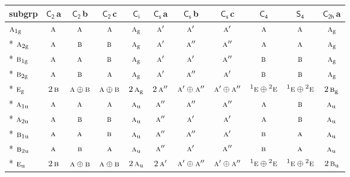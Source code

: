 \documentclass[10pt,a4paper]{article}
\numberwithin{equation}{section}
\newcommand{\grp}[1]{\mathsf{#1}}
\newcommand{\irr}[1]{\text{\normalfont\scshape #1}}
\newcommand{\conjpair}[1]{{}^{#1}}
\newcommand{\ptag}[1]{\mathrm{#1}}
\newcommand{\clsletter}[1]{\,{\scriptsize\color{black!55}#1}}
\begin{document}
{\small\begin{longtable}{@{}lcccccccccc@{}}\toprule
subgrp & \href{C2.pdf}{$\grp{C_{2}}$}\clsletter{a} & \href{C2.pdf}{$\grp{C_{2}}$}\clsletter{b} & \href{C2.pdf}{$\grp{C_{2}}$}\clsletter{c} & \href{S2.pdf}{$\grp{C_{i}}$} & \href{C1v.pdf}{$\grp{C_{s}}$}\clsletter{a} & \href{C1v.pdf}{$\grp{C_{s}}$}\clsletter{b} & \href{C1v.pdf}{$\grp{C_{s}}$}\clsletter{c} & \href{C4.pdf}{$\grp{C_{4}}$} & \href{S4.pdf}{$\grp{S_{4}}$} & \href{C2h.pdf}{$\grp{C_{2h}}$}\clsletter{a}\\\midrule\endhead
\bottomrule\endfoot\endlastfoot
$\irr{a}_{1\ptag{g}}$ & $\irr{a}$ & $\irr{a}$ & $\irr{a}$ & $\irr{a}_{\ptag{g}}$ & $\irr{a}'$ & $\irr{a}'$ & $\irr{a}'$ & $\irr{a}$ & $\irr{a}$ & $\irr{a}_{\ptag{g}}$\\*
$\irr{a}_{2\ptag{g}}$ & $\irr{a}$ & $\irr{b}$ & $\irr{b}$ & $\irr{a}_{\ptag{g}}$ & $\irr{a}'$ & $\irr{a}''$ & $\irr{a}''$ & $\irr{a}$ & $\irr{a}$ & $\irr{a}_{\ptag{g}}$\\*
$\irr{b}_{1\ptag{g}}$ & $\irr{a}$ & $\irr{a}$ & $\irr{b}$ & $\irr{a}_{\ptag{g}}$ & $\irr{a}'$ & $\irr{a}'$ & $\irr{a}''$ & $\irr{b}$ & $\irr{b}$ & $\irr{a}_{\ptag{g}}$\\*
$\irr{b}_{2\ptag{g}}$ & $\irr{a}$ & $\irr{b}$ & $\irr{a}$ & $\irr{a}_{\ptag{g}}$ & $\irr{a}'$ & $\irr{a}''$ & $\irr{a}'$ & $\irr{b}$ & $\irr{b}$ & $\irr{a}_{\ptag{g}}$\\*
$\irr{e}_{\ptag{g}}$ & $2\,\irr{b}$ & $\irr{a}\oplus \irr{b}$ & $\irr{a}\oplus \irr{b}$ & $2\,\irr{a}_{\ptag{g}}$ & $2\,\irr{a}''$ & $\irr{a}'\oplus \irr{a}''$ & $\irr{a}'\oplus \irr{a}''$ & $\conjpair{1}\irr{e}\oplus \conjpair{2}\irr{e}$ & $\conjpair{1}\irr{e}\oplus \conjpair{2}\irr{e}$ & $2\,\irr{b}_{\ptag{g}}$\\*
$\irr{a}_{1\ptag{u}}$ & $\irr{a}$ & $\irr{a}$ & $\irr{a}$ & $\irr{a}_{\ptag{u}}$ & $\irr{a}''$ & $\irr{a}''$ & $\irr{a}''$ & $\irr{a}$ & $\irr{b}$ & $\irr{a}_{\ptag{u}}$\\*
$\irr{a}_{2\ptag{u}}$ & $\irr{a}$ & $\irr{b}$ & $\irr{b}$ & $\irr{a}_{\ptag{u}}$ & $\irr{a}''$ & $\irr{a}'$ & $\irr{a}'$ & $\irr{a}$ & $\irr{b}$ & $\irr{a}_{\ptag{u}}$\\*
$\irr{b}_{1\ptag{u}}$ & $\irr{a}$ & $\irr{a}$ & $\irr{b}$ & $\irr{a}_{\ptag{u}}$ & $\irr{a}''$ & $\irr{a}''$ & $\irr{a}'$ & $\irr{b}$ & $\irr{a}$ & $\irr{a}_{\ptag{u}}$\\*
$\irr{b}_{2\ptag{u}}$ & $\irr{a}$ & $\irr{b}$ & $\irr{a}$ & $\irr{a}_{\ptag{u}}$ & $\irr{a}''$ & $\irr{a}'$ & $\irr{a}''$ & $\irr{b}$ & $\irr{a}$ & $\irr{a}_{\ptag{u}}$\\*
$\irr{e}_{\ptag{u}}$ & $2\,\irr{b}$ & $\irr{a}\oplus \irr{b}$ & $\irr{a}\oplus \irr{b}$ & $2\,\irr{a}_{\ptag{u}}$ & $2\,\irr{a}'$ & $\irr{a}'\oplus \irr{a}''$ & $\irr{a}'\oplus \irr{a}''$ & $\conjpair{1}\irr{e}\oplus \conjpair{2}\irr{e}$ & $\conjpair{1}\irr{e}\oplus \conjpair{2}\irr{e}$ & $2\,\irr{b}_{\ptag{u}}$\\
\bottomrule\end{longtable}}
\end{document}
